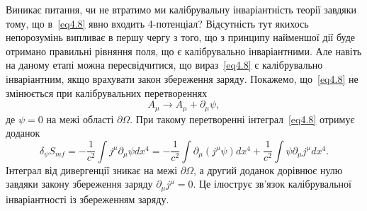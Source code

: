 Виникає питання, чи не втратимо ми калібрувальну інваріантність теорії завдяки тому, що в~\eqref{eq4.8} явно входить 4-потенціал? Відсутність тут якихось непорозумінь випливає в першу чергу з того, що з принципу найменшої дії буде отримано правильні рівняння поля, що є калібрувально інваріантними. Але навіть на даному етапі можна пересвідчитися, що вираз~\eqref{eq4.8} є калібрувально інваріантним, якщо врахувати закон збереження заряду. Покажемо, що~\eqref{eq4.8} не змінюється при калібрувальних перетвореннях
\begin{equation*}
A_\mu \to A_\mu + \partial_\mu \psi,
\end{equation*}
де $\psi = 0$ на межі області $\partial\Omega$. При такому перетворенні інтеграл~\eqref{eq4.8} отримує доданок
\begin{equation*}
\delta_\psi S_{mf} = -\frac{1}{c^2} \int j^\mu \partial_\mu \psi dx^4 = -\frac{1}{c^2} \int \partial_\mu (j^\mu \psi) dx^4 + \frac{1}{c^2} \int \psi \partial_\mu j^\mu dx^4.
\end{equation*}
Інтеграл від дивергенції зникає на межі $\partial\Omega$, а другий доданок дорівнює нулю завдяки закону збереження заряду $\partial_\mu j^\mu = 0$. Це ілюструє зв'язок калібрувальної інваріантності із збереженням заряду.

